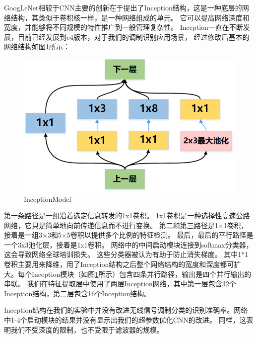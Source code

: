 GoogLeNet相较于CNN主要的创新在于提出了Inception结构，这是一种底层的网络结构，其类似于卷积核一样，是一种网络组成的单元。
它可以提高网络深度和宽度，并能够将不同规模的特性推广到一般管理复杂性。
Inception一直在不断发展，目前已经发展到$v4$版本，对于我们的调制识别应用场景，
经过修改后基本的网络结构如图\ref{sec:fig_5_5}所示：\par
\begin{figure}[!h]
	\centering
	\includegraphics[scale=0.8]{figures/chapter_5/fig_5_5}
	\caption{InceptionModel}\label{sec:fig_5_5}
\end{figure}
第一条路径是一组沿着选定信息转发的1x1卷积。
1x1卷积是一种选择性高速公路网络，它只是简单地向前传递信息而不进行变换。
第二和第三路径是1×1卷积，接着是一组3×3和5×5卷积以提供多个比例的特征检测。
最后，最后的平行路径是一个3x3池化层，接着是1x1卷积。
网络中的中间启动模块连接到softmax分类器，这会导致网络全球培训损失。
这些分类器被认为有助于防止消失梯度。
其中1*1卷积主要用来降维，用了Inception结构之后整个网络结构的宽度和深度都可扩大。每个Inception模块（如图\ref{sec:fig_5_5}所示）包含四条并行路径，输出是四个并行输出的串联。
我们在特征提取层中使用了两层Inception网络，其中第一层包含32个Inception结构，第二层包含16个Inception结构。\par

Inception结构在我们的实验中并没有改进无线信号调制分类的识别准确率。网络中1-4个启动模块的结果并没有显示出我们的超参数优化CNN的改进。 同样，这表明我们不受深度的限制，也不受限于滤波器的规模。\par

